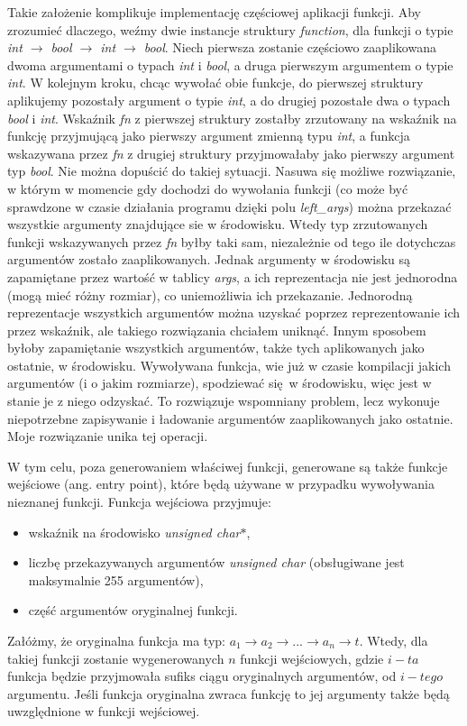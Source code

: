 \documentclass[declaration,shortabstract]{iithesis}
\begin{document}
Takie założenie komplikuje implementację częściowej aplikacji funkcji. Aby 
zrozumieć dlaczego, weźmy dwie instancje struktury \textit{function}, dla 
funkcji o typie \textit{int $\rightarrow$ bool $\rightarrow$ int 
$\rightarrow$ bool}. Niech pierwsza zostanie częściowo zaaplikowana dwoma 
argumentami o typach \textit{int} i \textit{bool}, a druga pierwszym argumentem
o typie \textit{int}. W kolejnym kroku, chcąc wywołać obie funkcje, do 
pierwszej struktury aplikujemy pozostały argument o typie \textit{int}, a do 
drugiej pozostałe dwa o typach \textit{bool} i \textit{int}. Wskaźnik \textit
{fn} z pierwszej struktury zostałby zrzutowany na wskaźnik na funkcję 
przyjmującą jako pierwszy argument zmienną typu \textit{int}, a funkcja 
wskazywana przez \textit{fn} z drugiej struktury przyjmowałaby jako pierwszy 
argument typ \textit{bool}. Nie można dopuścić do takiej sytuacji. Nasuwa się 
możliwe rozwiązanie, w którym w momencie gdy dochodzi do wywołania funkcji (co 
może być sprawdzone w czasie działania programu dzięki polu 
\textit{left\_args}) można przekazać wszystkie argumenty znajdujące sie w 
środowisku. Wtedy typ zrzutowanych funkcji wskazywanych przez \textit{fn} byłby 
taki sam, niezależnie od tego ile dotychczas argumentów zostało zaaplikowanych.
Jednak argumenty w środowisku są zapamiętane przez wartość w tablicy \textit
{args}, a ich reprezentacja nie jest jednorodna (mogą mieć różny rozmiar), 
co uniemożliwia ich przekazanie.
Jednorodną reprezentacje wszystkich argumentów można uzyskać poprzez 
reprezentowanie ich przez wskaźnik, ale takiego rozwiązania chciałem uniknąć.
Innym sposobem byłoby zapamiętanie wszystkich argumentów, także tych 
aplikowanych jako ostatnie, w środowisku. Wywoływana funkcja, wie już w czasie 
kompilacji jakich argumentów (i o jakim rozmiarze), spodziewać się w środowisku,
więc jest w stanie je z niego odzyskać. To rozwiązuje wspomniany 
problem, lecz wykonuje niepotrzebne zapisywanie i ładowanie argumentów 
zaaplikowanych jako ostatnie. Moje rozwiązanie unika tej operacji. 

W tym celu, poza generowaniem właściwej funkcji, generowane są także funkcje 
wejściowe (ang. entry point), które będą używane w przypadku wywoływania 
nieznanej funkcji. 
Funkcja wejściowa przyjmuje: 
\begin{itemize}
  \item wskaźnik na środowisko \textit{unsigned char$\ast$},
  \item liczbę przekazywanych argumentów \textit{unsigned char} 
  (obsługiwane jest maksymalnie 255 argumentów),
  \item część argumentów oryginalnej funkcji.
\end{itemize}
Załóżmy, że oryginalna funkcja ma typ: $a_1 \rightarrow a_2 \rightarrow ...
\rightarrow a_n \rightarrow t$. Wtedy, dla takiej funkcji zostanie wygenerowanych $n$ funkcji 
wejściowych, gdzie $i-ta$ funkcja będzie przyjmowała sufiks ciągu oryginalnych
argumentów, od $i-tego$ argumentu. Jeśli funkcja oryginalna zwraca funkcję to 
jej argumenty także będą uwzględnione w funkcji wejściowej.
\end{document}
